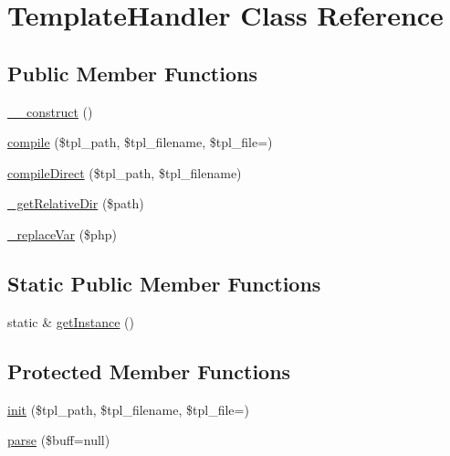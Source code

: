 \hypertarget{classTemplateHandler}{}\section{Template\+Handler Class Reference}
\label{classTemplateHandler}
\subsection*{Public Member Functions}
\begin{DoxyCompactItemize}
\item 
\hyperlink{classTemplateHandler_ab113c65769e65c4fe531c4cf41655f1d}{\+\_\+\+\_\+construct} ()
\item 
\hyperlink{classTemplateHandler_aa3c14009a95a7258695563377f443e36}{compile} (\$tpl\+\_\+path, \$tpl\+\_\+filename, \$tpl\+\_\+file=\textquotesingle{}\textquotesingle{})
\item 
\hyperlink{classTemplateHandler_a1fe9c84873c23970ea7779be59dcb2d5}{compile\+Direct} (\$tpl\+\_\+path, \$tpl\+\_\+filename)
\item 
\hyperlink{classTemplateHandler_a6d8e3da7128be8bded89dc9edc4a1bc8}{\+\_\+get\+Relative\+Dir} (\$path)
\item 
\hyperlink{classTemplateHandler_a10cb255c35e1e617f182e349b80cc335}{\+\_\+replace\+Var} (\$php)
\end{DoxyCompactItemize}
\subsection*{Static Public Member Functions}
\begin{DoxyCompactItemize}
\item 
static \& \hyperlink{classTemplateHandler_a9745460c5daccfc48abf8652778b2718}{get\+Instance} ()
\end{DoxyCompactItemize}
\subsection*{Protected Member Functions}
\begin{DoxyCompactItemize}
\item 
\hyperlink{classTemplateHandler_aa9d8d24cbde5510e9ad9bd2951a18542}{init} (\$tpl\+\_\+path, \$tpl\+\_\+filename, \$tpl\+\_\+file=\textquotesingle{}\textquotesingle{})
\item 
\hyperlink{classTemplateHandler_acf0023ac6383d43e9b0ab854c75c0694}{parse} (\$buff=null)
\end{DoxyCompactItemize}


